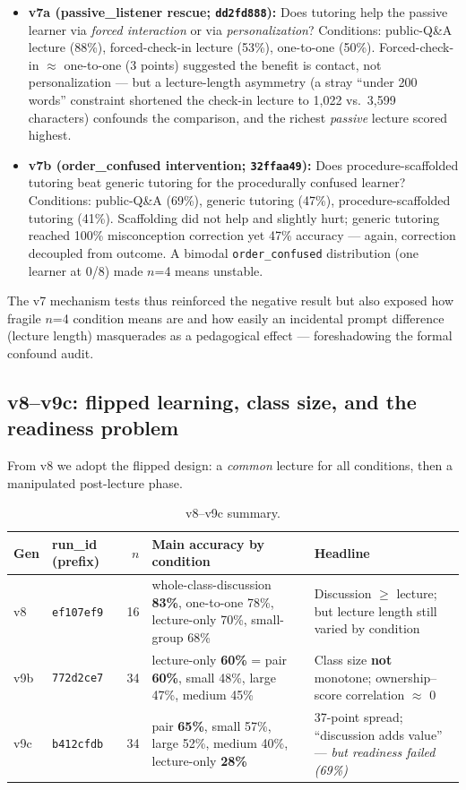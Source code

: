 \documentclass[11pt]{article}
\begin{document}
\begin{itemize}
  \item \textbf{v7a (passive\_listener rescue; \texttt{dd2fd888}):}  Does tutoring
    help the passive learner via \emph{forced interaction} or via
    \emph{personalization}?  Conditions: public-Q\&A lecture (88\%), forced-check-in
    lecture (53\%), one-to-one (50\%).  Forced-check-in $\approx$ one-to-one (3
    points) suggested the benefit is contact, not personalization --- but a
    lecture-length asymmetry (a stray ``under 200 words'' constraint shortened the
    check-in lecture to 1,022 vs.\ 3,599 characters) confounds the comparison, and
    the richest \emph{passive} lecture scored highest.
  \item \textbf{v7b (order\_confused intervention; \texttt{32ffaa49}):}  Does
    procedure-scaffolded tutoring beat generic tutoring for the procedurally confused
    learner?  Conditions: public-Q\&A (69\%), generic tutoring (47\%),
    procedure-scaffolded tutoring (41\%).  Scaffolding did not help and slightly hurt;
    generic tutoring reached 100\% misconception correction yet 47\% accuracy ---
    again, correction decoupled from outcome.  A bimodal \texttt{order\_confused}
    distribution (one learner at 0/8) made $n$=4 means unstable.
\end{itemize}

The v7 mechanism tests thus reinforced the negative result but also exposed how
fragile $n$=4 condition means are and how easily an incidental prompt difference
(lecture length) masquerades as a pedagogical effect --- foreshadowing the formal
confound audit.

\subsection{v8--v9c: flipped learning, class size, and the readiness problem}

From v8 we adopt the flipped design: a \emph{common} lecture for all conditions, then
a manipulated post-lecture phase.

\begin{table}[h]
\centering
\caption{v8--v9c summary.}
\label{tab:v8-v9c}
\begin{tabular}{@{}llrp{5.5cm}p{4cm}@{}}
\toprule
Gen & run\_id (prefix) & $n$ & Main accuracy by condition & Headline \\
\midrule
v8  & \texttt{ef107ef9} & 16 & whole-class-discussion \textbf{83\%}, one-to-one 78\%, lecture-only 70\%, small-group 68\% & Discussion $\geq$ lecture; but lecture length still varied by condition \\
v9b & \texttt{772d2ce7} & 34 & lecture-only \textbf{60\%} = pair \textbf{60\%}, small 48\%, large 47\%, medium 45\% & Class size \textbf{not} monotone; ownership--score correlation $\approx$ 0 \\
v9c & \texttt{b412cfdb} & 34 & pair \textbf{65\%}, small 57\%, large 52\%, medium 40\%, lecture-only \textbf{28\%} & 37-point spread; ``discussion adds value'' --- \emph{but readiness failed (69\%)} \\
\bottomrule
\end{tabular}
\end{table}
\end{document}
